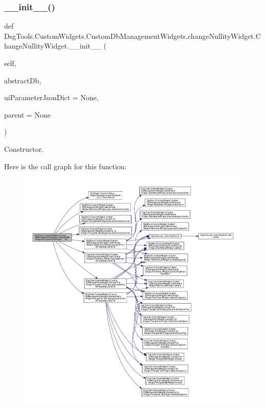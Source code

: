 \subsubsection{\texorpdfstring{\+\_\+\+\_\+init\+\_\+\+\_\+()}{\_\_init\_\_()}}
{\footnotesize\ttfamily def Dsg\+Tools.\+Custom\+Widgets.\+Custom\+Db\+Management\+Widgets.\+change\+Nullity\+Widget.\+Change\+Nullity\+Widget.\+\_\+\+\_\+init\+\_\+\+\_\+ (\begin{DoxyParamCaption}\item[{}]{self,  }\item[{}]{abstract\+Db,  }\item[{}]{ui\+Parameter\+Json\+Dict = {\ttfamily None},  }\item[{}]{parent = {\ttfamily None} }\end{DoxyParamCaption})}

\begin{DoxyVerb}Constructor.\end{DoxyVerb}
 Here is the call graph for this function\+:
\nopagebreak
\begin{figure}[H]
\begin{center}
\leavevmode
\includegraphics[width=350pt]{class_dsg_tools_1_1_custom_widgets_1_1_custom_db_management_widgets_1_1change_nullity_widget_1_1_change_nullity_widget_a69eab086a7ce49e4db46769a363c2ebb_cgraph}
\end{center}
\end{figure}


